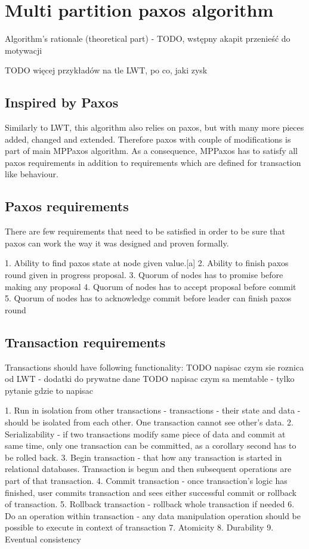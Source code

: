 
\section{Multi partition paxos algorithm}


Algorithm’s rationale (theoretical part) - TODO, wstępny akapit przenieść do motywacji


TODO więcej przykładów na tle LWT, po co, jaki zysk


\subsection{Inspired by Paxos}
Similarly to LWT, this algorithm also relies on paxos, but with many more pieces added, changed and extended. 
Therefore paxos with couple of modifications is part of main MPPaxos algorithm. As a consequence, MPPaxos has to satisfy all paxos requirements in addition to requirements which are defined for transaction like behaviour.         


\subsection{Paxos requirements}
There are few requirements that need to be satisfied in order to be sure that paxos can work the way it was designed and proven formally. 


1. Ability to find paxos state at node given value.[a]
2. Ability to finish paxos round given in progress proposal.
3. Quorum of nodes has to promise before making any proposal
4. Quorum of nodes has to accept proposal before commit
5. Quorum of nodes has to acknowledge commit before leader can finish paxos round


\subsection{Transaction requirements}
Transactions should have following functionality:
TODO napisac czym sie roznica od LWT - dodatki do prywatne dane
TODO napisac czym sa memtable - tylko pytanie gdzie to napisac


1. Run in isolation from other transactions - transactions - their state and data - should be isolated from each other. One transaction cannot see other’s data.
2. Serializability - if two transactions modify same piece of data and commit at same time, only one transaction can be committed, as a corollary second has to be rolled back.
3. Begin transaction - that how any transaction is started in relational databases. Transaction is begun and then subsequent operations are part of that transaction.
4. Commit transaction - once transaction’s logic has finished, user commits transaction and sees either successful commit or rollback of transaction. 
5. Rollback transaction - rollback whole transaction if needed
6. Do an operation within transaction - any data manipulation operation should be possible to execute in context of transaction
7. Atomicity
8. Durability
9. Eventual consistency


